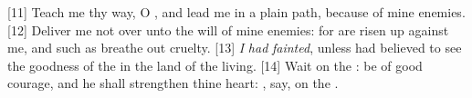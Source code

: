 [11] \textcolor[cmyk]{0.99998,1,0,0}{Teach me thy way, O , and lead me in a plain path, because of mine enemies.}
[12] \textcolor[cmyk]{0.99998,1,0,0}{Deliver me not over unto the will of mine enemies: for  are risen up against me, and such as breathe out cruelty.}
[13] \textcolor[cmyk]{0.99998,1,0,0}{\emph{I} \emph{had} \emph{fainted}, unless  had believed to see the goodness of the  in the land of the living.}
[14] \textcolor[cmyk]{0.99998,1,0,0}{Wait on the : be of good courage, and he shall strengthen thine heart: ,  say, on the .}